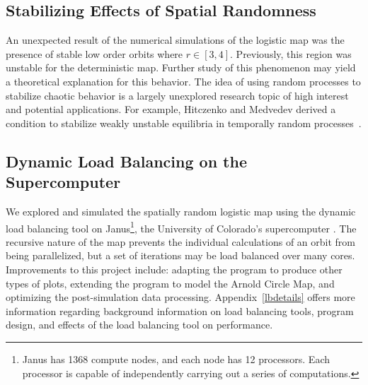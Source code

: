 \subsection{Stabilizing Effects of Spatial Randomness}
An unexpected result of the numerical simulations of the logistic map
was the presence of stable low order orbits where $r \in
[3,4]$. Previously, this region was unstable for the deterministic
map. Further study of this phenomenon may yield a theoretical
explanation for this behavior. The idea of using random processes to
stabilize chaotic behavior is a largely unexplored research topic of
high interest and potential applications. For example, Hitczenko and Medvedev derived a condition to stabilize weakly
unstable equilibria in temporally random processes~\cite{hitczenko}.
\subsection{Dynamic Load Balancing on the Supercomputer}
We explored and simulated the spatially random logistic map using the
dynamic load balancing tool on Janus\footnote{Janus has 1368 compute nodes, and
  each node has 12 processors. Each processor is capable of
  independently carrying
  out a series of computations.}, the University of Colorado's supercomputer
\cite{janus}. The recursive nature of the map prevents the individual
calculations of an orbit from being parallelized, but a set of
iterations may be load balanced over many
cores. Improvements to this project include: adapting the program to
produce other types of plots, extending the program to model
the Arnold Circle Map, and optimizing the post-simulation data
processing. Appendix~\ref{lbdetails} offers more information regarding
background information on load balancing tools, program design, and effects of the load balancing tool on performance.